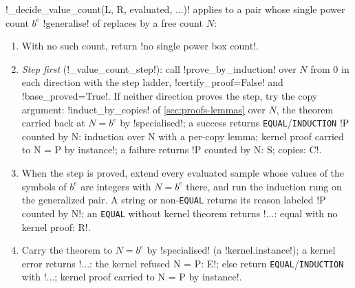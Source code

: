 \begin{algorithm}\label{alg:proofs-value-count}
\py!_decide_value_count(L, R, evaluated, ...)! applies to a pair whose single power \bbox{} count $b^e$ \py!generalise! of  replaces by a free count $N$:
\begin{enumerate}
\item With no such count, return \code!no single power box count!.
\item \emph{Step first} (\py!_value_count_step!): call \py!prove_by_induction! over $N$ from $0$ in each direction with the step ladder, \py!certify_proof=False! and \py!base_proved=True!. If neither direction proves the step, try the copy argument: \py!induct_by_copies! of \cref{sec:proofs-lemmas} over $N$, the theorem carried back at $N=b^e$ by \py!specialised!; a success returns \texttt{EQUAL}/\allowbreak\texttt{INDUCTION} \code!P counted by N: induction over N with a per-copy lemma; kernel proof carried to N = P by instance!; a failure returns \code!P counted by N: S; copies: C!.
\item When the step is proved, extend every evaluated sample whose values of the symbols of $b^e$ are integers with $N=b^e$ there, and run the induction rung on the generalized pair. A string or non-\texttt{EQUAL} returns its reason labeled \code!P counted by N!; an \texttt{EQUAL} without kernel theorem returns \code!...: equal with no kernel proof: R!.
\item Carry the theorem to $N=b^e$ by \py!specialised! (a \py!kernel.instance!); a kernel error returns \code!...: the kernel refused N = P: E!; else return \texttt{EQUAL}/\allowbreak\texttt{INDUCTION} with \code!...; kernel proof carried to N = P by instance!.
\end{enumerate}
\end{algorithm}

